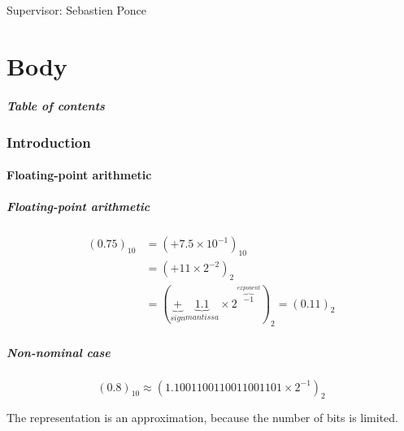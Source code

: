 \documentclass{beamer}
\begin{document}
\begin{frame}
    \maketitle

    Supervisor: Sebastien Ponce
\end{frame}

\part{Body}

\begin{frame}
    \frametitle{Table of contents}
    \tableofcontents
\end{frame}

\section{Introduction}

\begin{frame}
    \tableofcontents[currentsection]
\end{frame}

\subsection{Floating-point arithmetic}

\begin{frame}
    \frametitle{Floating-point arithmetic}

    \begin{displaymath}
        \begin{split}
            (0.75)_{10} & = (+ 7.5 \times 10^{-1})_{10} \\
            & = (+11 \times 2^{-2})_{2} \\
            & = (\underbrace{+}_{sign} \underbrace{1.1}_{mantissa} \times 2^{\overbrace{-1}^{exponent}})_{2} = (0.11)_{2}
        \end{split}
    \end{displaymath}
\end{frame}

\begin{frame}
    \frametitle{Non-nominal case}

    \begin{displaymath}
        (0.8)_{10} \approx (1.1001100110011001101 \times 2^{-1})_{2}
    \end{displaymath}

    The representation is an approximation, because the number of bits is limited.
\end{frame}
\end{document}
